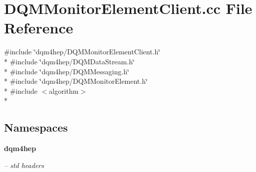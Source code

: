 \section{D\+Q\+M\+Monitor\+Element\+Client.\+cc File Reference}
\label{DQMMonitorElementClient_8cc}
{\ttfamily \#include \char`\"{}dqm4hep/\+D\+Q\+M\+Monitor\+Element\+Client.\+h\char`\"{}}\\*
{\ttfamily \#include \char`\"{}dqm4hep/\+D\+Q\+M\+Data\+Stream.\+h\char`\"{}}\\*
{\ttfamily \#include \char`\"{}dqm4hep/\+D\+Q\+M\+Messaging.\+h\char`\"{}}\\*
{\ttfamily \#include \char`\"{}dqm4hep/\+D\+Q\+M\+Monitor\+Element.\+h\char`\"{}}\\*
{\ttfamily \#include $<$algorithm$>$}\\*
\subsection*{Namespaces}
\begin{DoxyCompactItemize}
\item 
 {\bf dqm4hep}
\begin{DoxyCompactList}\small\item\em -- std headers \end{DoxyCompactList}\end{DoxyCompactItemize}
